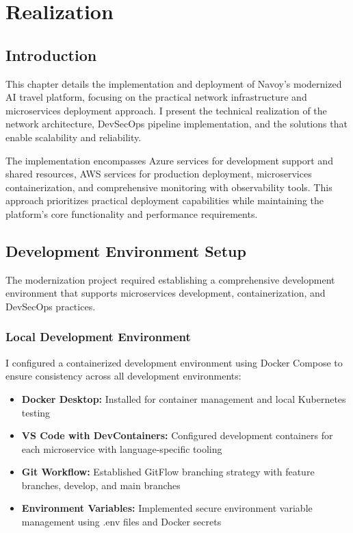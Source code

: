 \chapter{Realization}
\minitoc
\newpage

\setcounter{secnumdepth}{0} %
\section{Introduction}
This chapter details the implementation and deployment of Navoy's modernized AI travel platform, focusing on the practical network infrastructure and microservices deployment approach. I present the technical realization of the network architecture, DevSecOps pipeline implementation, and the solutions that enable scalability and reliability.

The implementation encompasses Azure services for development support and shared resources, AWS services for production deployment, microservices containerization, and comprehensive monitoring with observability tools. This approach prioritizes practical deployment capabilities while maintaining the platform's core functionality and performance requirements.

\setcounter{secnumdepth}{2} %
\section{Development Environment Setup}
The modernization project required establishing a comprehensive development environment that supports microservices development, containerization, and DevSecOps practices.

\subsection{Local Development Environment}
I configured a containerized development environment using Docker Compose to ensure consistency across all development environments:

\begin{itemize}
    \item \textbf{Docker Desktop:} Installed for container management and local Kubernetes testing
    \item \textbf{VS Code with DevContainers:} Configured development containers for each microservice with language-specific tooling
    \item \textbf{Git Workflow:} Established GitFlow branching strategy with feature branches, develop, and main branches
    \item \textbf{Environment Variables:} Implemented secure environment variable management using .env files and Docker secrets
\end{itemize}

